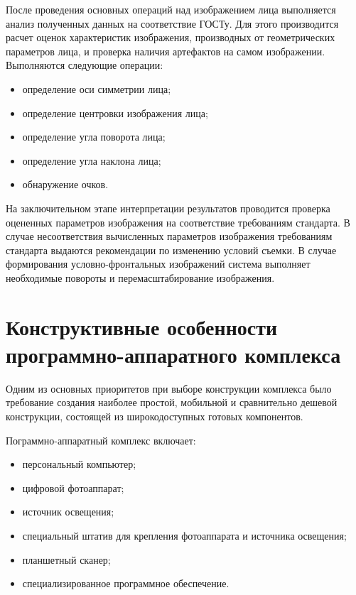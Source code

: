 \begin{multicols}{2}
\bigskip
\addtocounter{figure}{1}

После проведения основных операций над изоб\-ра\-же\-нием лица выполняется анализ полученных данных на соответствие ГОСТу. 
Для этого производится расчет оценок характеристик изображения, производных от геометрических параметров лица, и проверка 
наличия артефактов на самом изображении. Выполняются следующие операции:
\begin{itemize}
\item определение оси симметрии лица;
\item определение центровки изображения лица;
\item определение угла поворота лица;
\item определение угла наклона лица;
\item обнаружение очков.
\end{itemize}

На заключительном этапе интерпретации\linebreak
результатов проводится проверка оцененных параметров изображения на соответствие 
требованиям стандарта. В случае несоответствия вычисленных параметров изображения требованиям стандарта выдаются 
рекомендации по изменению условий съемки. В случае формирования условно-фрон\-таль\-ных изображений система выполняет 
необходимые повороты и перемасштабирование изображения.

\section{Конструктивные особенности программно-аппаратного комплекса}
Одним из основных приоритетов при выборе конструкции комплекса было требование создания наиболее простой, мобильной и 
сравнительно дешевой конструкции, состоящей из широкодоступных готовых компонентов.

Пограммно-аппаратный комплекс включает:
\begin{itemize}
\item персональный компьютер;
\item цифровой фотоаппарат;
\item источник освещения;
\item специальный штатив для крепления фотоаппарата и источника освещения;
\item планшетный сканер;
\item специализированное программное обеспечение.
\end{itemize}


\end{multicols}

